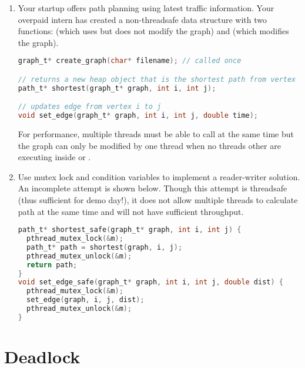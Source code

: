 \begin{enumerate}
\item Your startup offers path planning using latest traffic information. Your overpaid intern has created a non-threadsafe data structure with two functions:  (which uses but does not modify the graph) and  (which modifies the graph).

\begin{lstlisting}[language=C]
graph_t* create_graph(char* filename); // called once

// returns a new heap object that is the shortest path from vertex i to j
path_t* shortest(graph_t* graph, int i, int j);

// updates edge from vertex i to j
void set_edge(graph_t* graph, int i, int j, double time);

\end{lstlisting}

For performance, multiple threads must be able to call  at the same time but the graph can only be modified by one thread when no threads other are executing inside  or .

\item Use mutex lock and condition variables to implement a reader-writer solution. An incomplete attempt is shown below. Though this attempt is threadsafe (thus sufficient for demo day!), it does not allow multiple threads to calculate  path at the same time and will not have sufficient throughput.

\begin{lstlisting}[language=C]
path_t* shortest_safe(graph_t* graph, int i, int j) {
  pthread_mutex_lock(&m);
  path_t* path = shortest(graph, i, j);
  pthread_mutex_unlock(&m);
  return path;
}
void set_edge_safe(graph_t* graph, int i, int j, double dist) {
  pthread_mutex_lock(&m);
  set_edge(graph, i, j, dist);
  pthread_mutex_unlock(&m);
}
\end{lstlisting}

\end{enumerate}

\section{Deadlock}

